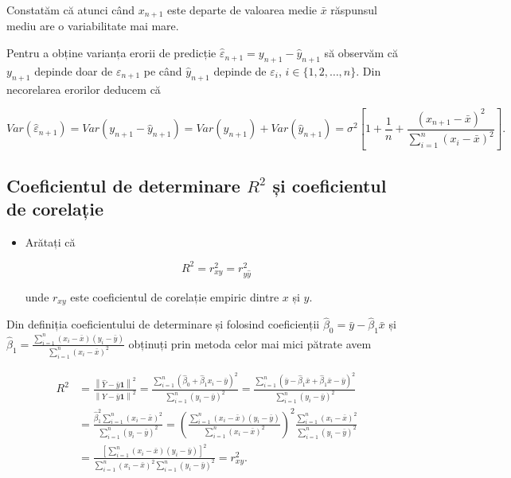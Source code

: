 \documentclass[]{article}
\newenvironment{frshaded*}{%
  \def\FrameCommand{\fboxrule=\FrameRule\fboxsep=\FrameSep \fcolorbox{framecolor}{shadecolor1}}%
  \MakeFramed {\advance\hsize-\width \FrameRestore}}%
{\endMakeFramed}
\newenvironment{rmdblock}[1]
  {\begin{frshaded*}
  \begin{itemize}
  \renewcommand{\labelitemi}{
    \raisebox{-.7\height}[0pt][0pt]{
      {\setkeys{Gin}{width=2em,keepaspectratio}\texttt{[image: images/icons/\#1]}}
    }
  }
  \item
  }
  {
  \end{itemize}
  \end{frshaded*}
  }
\newenvironment{rmdexercise}
  {\begin{rmdblock}{exercise}}
  {\end{rmdblock}}
\begin{document}
Constatăm că atunci când \(x_{n+1}\) este departe de valoarea medie
\(\bar x\) răspunsul mediu are o variabilitate mai mare.

Pentru a obține varianța erorii de predicție
\(\hat\varepsilon_{n+1} = y_{n+1} - \hat y_{n+1}\) să observăm că
\(y_{n+1}\) depinde doar de \(\varepsilon_{n+1}\) pe când
\(\hat y_{n+1}\) depinde de \(\varepsilon_i\), \(i\in\{1,2,\ldots,n\}\).
Din necorelarea erorilor deducem că

\[
  Var(\hat\varepsilon_{n+1}) = Var(y_{n+1} - \hat y_{n+1}) = Var(y_{n+1}) + Var(\hat y_{n+1}) = \sigma^2\left[1 + \frac{1}{n} + \frac{(x_{n+1} - \bar x)^2}{\sum_{i=1}^{n}(x_i - \bar x)^2}\right].
\]

\hypertarget{reg_sim_ex_2}{\subsection{\texorpdfstring{Coeficientul de
determinare \(R^2\) și coeficientul de
corelație}{Coeficientul de determinare R\^{}2 și coeficientul de corelație}}\label{reg_sim_ex_2}}

\begin{rmdexercise}
Arătați că

\[
  R^2 = r_{xy}^2 = r_{y\hat y}^2
\]

unde \(r_{xy}\) este coeficientul de corelație empiric dintre \(x\) și
\(y\).
\end{rmdexercise}

Din definiția coeficientului de determinare și folosind coeficienții
\(\hat\beta_0 = \bar y - \hat\beta_1 \bar x\) și
\(\hat\beta_1 = \frac{\sum_{i = 1}^{n}(x_i - \bar x)(y_i - \bar y)}{\sum_{i = 1}^{n}(x_i - \bar x)^2}\)
obținuți prin metoda celor mai mici pătrate avem

\begin{align*}
R^2 &= \frac{\left\lVert \hat Y - \bar y \mathbf{1}\right\rVert^2}{\left\lVert Y - \bar y \mathbf{1}\right\rVert^2} = \frac{\sum_{i = 1}^{n}(\hat\beta_0 + \hat\beta_1 x_i - \bar y)^2}{\sum_{i = 1}^{n}(y_i - \bar y)^2} = \frac{\sum_{i = 1}^{n}(\bar y - \hat\beta_1 \bar x + \hat\beta_1\bar x - \bar y)^2}{\sum_{i = 1}^{n}(y_i - \bar y)^2}\\
  &= \frac{\hat\beta_1^2\sum_{i = 1}^{n}(x_i - \bar x)^2}{\sum_{i = 1}^{n}(y_i - \bar y)^2} = \left(\frac{\sum_{i = 1}^{n}(x_i - \bar x)(y_i - \bar y)}{\sum_{i = 1}^{n}(x_i - \bar x)^2}\right)^2\frac{\sum_{i = 1}^{n}(x_i - \bar x)^2}{\sum_{i = 1}^{n}(y_i - \bar y)^2}\\
  & = \frac{\left[\sum_{i = 1}^{n}(x_i - \bar x)(y_i - \bar y)\right]^2}{\sum_{i = 1}^{n}(x_i - \bar x)^2\sum_{i = 1}^{n}(y_i - \bar y)^2} = r_{xy}^2.
\end{align*}
\end{document}
